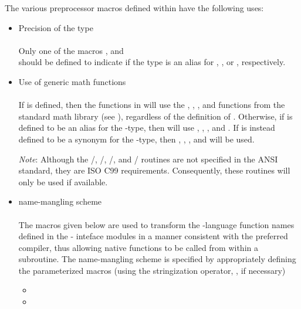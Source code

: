 The various preprocessor macros defined within  have the following uses:
\begin{itemize}

\item Precision of the {\sundials}  type\\ \\
  Only one of the macros ,  and \\
   should be defined to indicate if the {\sundials}
   type is an alias for , , or ,
  respectively.

\item Use of generic math functions\\ \\
  If  is defined, then the functions
  in  will use the , ,
  , and  functions from the standard math library
  (see ), regardless of the definition of .
  Otherwise, if  is defined to be an alias for the
   {\C}-type, then {\sundials} will use ,
  , , and .  If  is instead
  defined to be a synonym for the  {\C}-type, then
  , , , and  will be used.

  {\em Note}: Although the /, /,
  /, and / routines are not
  specified in the ANSI {\C} standard, they are ISO C99 requirements.
  Consequently, these routines will only be used if available.

\item {\F} name-mangling scheme\\ \\
  The macros given below are used to transform the {\C}-language
  function names defined in the {\F}-{\C} inteface modules in a manner
  consistent with the preferred {\F} compiler, thus allowing native
  {\C} functions to be called from within a {\F} subroutine. The
  name-mangling scheme is specified by appropriately
  defining the parameterized macros (using the stringization operator,
  \id{\#\#}, if necessary)
  \begin{itemize}
  \item {}
  \item {}
  \end{itemize}


\end{itemize}
